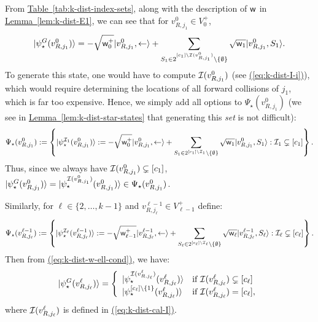 \documentclass{article}
\newcommand{\eq}[1]{\hyperref[eq:#1]{(\ref*{eq:#1})}}
\newcommand{\lem}[1]{\hyperref[lem:#1]{Lemma~\ref*{lem:#1}}}
\newcommand{\tabl}[1]{\hyperref[tab:#1]{Table~\ref*{tab:#1}}}
\def\ket#1{{\lvert}#1\rangle}
\renewcommand{\>}{\rangle}
\newcommand{\<}{\langle}
\renewcommand{\(}{\left(}
\renewcommand{\)}{\right)}
\def\w{{\sf w}}
\begin{document}
\noindent From \tabl{k-dist-index-sets}, along with the description of $\w$ in \lem{k-dist-E1}, we can see that for $v^0_{R,j_1}\in V_0^+$, 
\begin{equation*}
\ket{\psi_\star^{G}(v^0_{R,j_1})} = -\sqrt{\w_0^+}\ket{v_{R,j_1}^0,\leftarrow}+\sum_{S_1\in 2^{[c_1]\setminus{\cal I}(v_{R,j_1}^0)}\setminus\{\emptyset\}}\sqrt{\w_1}\ket{v_{R,j_1}^0,S_1}.
\end{equation*}
To generate this state, one would have to compute ${\cal I}(v^{0}_{R,j_1})$ (see \eq{k-dist-I-i}), which would require determining the locations of all forward collisions of $j_1$, which is far too expensive. Hence, we simply add all options to $\Psi_\star(v^{0}_{R,j_1})$ (we see in \lem{k-dist-star-states} that generating this \emph{set} is not difficult):
\begin{equation}
	\Psi_\star(v^0_{R,j_1}) := \left\{\ket{\psi_\star^{{\cal I}_1}(v^0_{R,j_1})}:=-\sqrt{\w_0^+}\ket{v^0_{R,j_1},\leftarrow}+ \sum_{S_{1}\in 2^{[c_{1}] \setminus {\cal I}_{1}}\setminus\{\emptyset\}} \sqrt{\w_{1}}\ket{v^0_{R,j_1},S_1} : {\cal I}_{1}\subsetneq[c_{1}]\right\}.\label{eq:k-Psi-v-0-plus}
\end{equation}
Thus, since we always have ${\cal I}(v^0_{R,j_1})\subsetneq[c_1]$, $\ket{\psi_\star^G(v^0_{R,j_1})}=\ket{\psi_\star^{{\cal I}(v^0_{R,j_1})}(v^0_{R,j_1})}\in \Psi_{\star}(v^0_{R,j_1})$. 

Similarly, for $\ell\in \{2,\dots,k-1\}$ and $v^{\ell-1}_{R,j_{\ell}}\in V_{\ell-1}^+$ define:
\begin{equation}
	\Psi_\star(v^{\ell-1}_{R,j_{\ell}}) := \left\{\ket{\psi_\star^{{\cal I}_{\ell}}(v^{\ell-1}_{R,j_{\ell}})}:=-\sqrt{\w_{\ell-1}^+}\ket{v^{\ell-1}_{R,j_{\ell}},\leftarrow}+ \sum_{S_{\ell}\in 2^{[c_{\ell}] \setminus {\cal I}_{\ell}}\setminus\{\emptyset\}} \sqrt{\w_{\ell}}\ket{v^{\ell-1}_{R,j_{\ell}},S_{\ell}} : {\cal I}_{\ell}\subsetneq[c_{\ell}]\right\}.\label{eq:k-Psi-v-ell-plus}
\end{equation}
Then from \eq{k-dist-w-ell-cond},  we have:
\begin{equation}
\ket{\psi_\star^G(v^{\ell}_{R,j_{\ell}})}=\left\{\begin{array}{ll}
\ket{\psi_\star^{{\cal I}(v^{\ell}_{R,j_{\ell}})}(v^{\ell}_{R,j_{\ell}})} & \mbox{if }{\cal I}(v^{\ell}_{R,j_{\ell}})\subsetneq[c_{\ell}]\\
\ket{\psi_\star^{[c_{\ell}]\setminus\{1\}}(v^{\ell}_{R,j_{\ell}})} & \mbox{if }{\cal I}(v^{\ell}_{R,j_{\ell}})=[c_{\ell}], 
\end{array}\right.
\label{k-star-v-ell-plus}
\end{equation}
where ${\cal I}(v^{\ell}_{R,j_{\ell}})$ is defined in \eq{k-dist-cal-I}.
\end{document}
